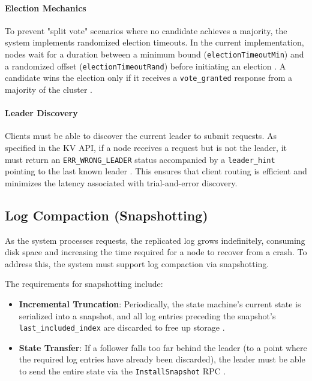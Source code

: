 \paragraph{Election Mechanics}
To prevent "split vote" scenarios where no candidate achieves a majority, the system implements randomized election timeouts. In the current implementation, nodes wait for a duration between a minimum bound (\texttt{electionTimeoutMin}) and a randomized offset (\texttt{electionTimeoutRand}) before initiating an election \cite{Raft2014}. A candidate wins the election only if it receives a \texttt{vote\_granted} response from a majority of the cluster \cite{10}.

\paragraph{Leader Discovery}
Clients must be able to discover the current leader to submit requests. As specified in the KV API, if a node receives a request but is not the leader, it must return an \texttt{ERR\_WRONG\_LEADER} status accompanied by a \texttt{leader\_hint} pointing to the last known leader \cite{19, 21}. This ensures that client routing is efficient and minimizes the latency associated with trial-and-error discovery.

\subsection{Log Compaction (Snapshotting)}
As the system processes requests, the replicated log grows indefinitely, consuming disk space and increasing the time required for a node to recover from a crash. To address this, the system must support log compaction via snapshotting.

The requirements for snapshotting include:
\begin{itemize}
    \item \textbf{Incremental Truncation}: Periodically, the state machine's current state is serialized into a snapshot, and all log entries preceding the snapshot's \texttt{last\_included\_index} are discarded to free up storage \cite{14}.
    \item \textbf{State Transfer}: If a follower falls too far behind the leader (to a point where the required log entries have already been discarded), the leader must be able to send the entire state via the \texttt{InstallSnapshot} RPC \cite{16}.
\end{itemize}

